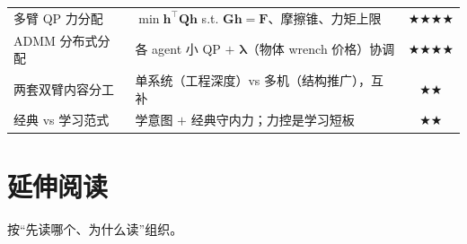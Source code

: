 \begin{table}[H]
\begin{tabular}{p{3.6cm}p{7.6cm}c}
多臂 QP 力分配 & $\min\mathbf{h}^\top\mathbf{Q}\mathbf{h}$ s.t. $\mathbf{G}\mathbf{h}=\mathbf{F}$、摩擦锥、力矩上限 & $\bigstar\bigstar\bigstar\bigstar$ \\
ADMM 分布式分配 & 各 agent 小 QP $+$ $\boldsymbol{\lambda}$（物体 wrench 价格）协调 & $\bigstar\bigstar\bigstar\bigstar$ \\
两套双臂内容分工 & 单系统（工程深度）vs 多机（结构推广），互补 & $\bigstar\bigstar$ \\
经典 vs 学习范式 & 学意图 $+$ 经典守内力；力控是学习短板 & $\bigstar\bigstar$ \\
\bottomrule
\end{tabular}
\end{table}

\section*{延伸阅读}
按“先读哪个、为什么读”组织。

